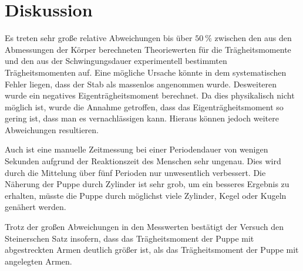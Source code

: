 \section{Diskussion}
\label{sec:Diskussion}
Es treten sehr große relative Abweichungen bis über $\SI{50}{\percent}$ zwischen
den aus den Abmessungen der Körper berechneten Theoriewerten für die Trägheitsmomente
und den aus der Schwingungsdauer experimentell bestimmten Trägheitsmomenten auf.
Eine mögliche Ursache könnte in dem systematischen Fehler liegen, dass der Stab
als massenlos angenommen wurde. Desweiteren wurde ein negatives Eigenträgheitsmoment
berechnet. Da dies physikalisch nicht möglich ist, wurde die Annahme getroffen,
dass das Eigenträgheitsmoment so gering ist, dass man es vernachlässigen kann.
Hieraus können jedoch weitere Abweichungen resultieren.

Auch ist eine manuelle Zeitmessung bei einer Periodendauer von wenigen Sekunden
aufgrund der Reaktionszeit des Menschen sehr ungenau. Dies wird durch die Mittelung
über fünf Perioden nur unwesentlich verbessert.
Die Näherung der Puppe durch Zylinder ist sehr grob, um ein besseres Ergebnis
zu erhalten, müsste die Puppe durch möglichst viele Zylinder, Kegel oder Kugeln
genähert werden.

Trotz der großen Abweichungen in den Messwerten bestätigt der Versuch den
Steinerschen Satz insofern, dass das Trägheitsmoment der Puppe mit abgestreckten
Armen deutlich größer ist, als das Trägheitsmoment der Puppe mit angelegten Armen.

